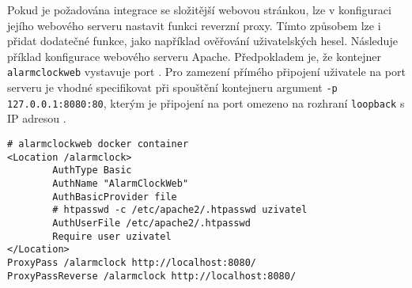 Pokud je požadována integrace se složitější webovou stránkou, lze v konfiguraci
jejího webového serveru nastavit funkci reverzní proxy. Tímto způsobem lze
i přidat dodatečné funkce, jako například ověřování uživatelských hesel.
Následuje příklad konfigurace webového serveru Apache.
Předpokladem je, že kontejner \texttt{alarmclockweb} vystavuje port
. Pro zamezení přímého připojení uživatele na port 
serveru je vhodné specifikovat při spouštění kontejneru argument
\texttt{-p 127.0.0.1:8080:80}, kterým je připojení na port  omezeno
na rozhraní \texttt{loopback} s IP adresou .
\begin{lstlisting}[style=numbers]
# alarmclockweb docker container
<Location /alarmclock>
        AuthType Basic
        AuthName "AlarmClockWeb"
        AuthBasicProvider file
        # htpasswd -c /etc/apache2/.htpasswd uzivatel
        AuthUserFile /etc/apache2/.htpasswd
        Require user uzivatel
</Location>
ProxyPass /alarmclock http://localhost:8080/
ProxyPassReverse /alarmclock http://localhost:8080/
\end{lstlisting}
